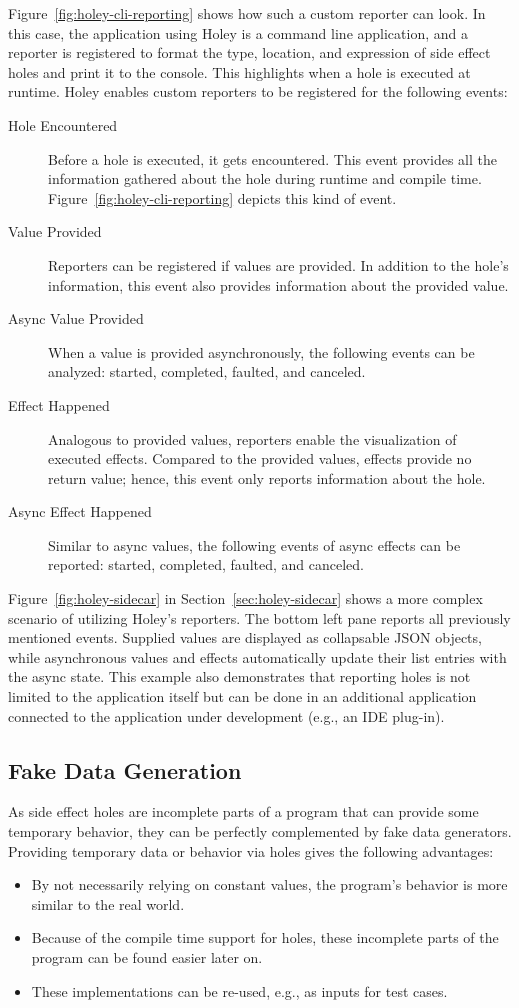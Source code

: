 Figure~\ref{fig:holey-cli-reporting} shows how such a custom reporter can look.
In this case, the application using Holey is a command line application, and a reporter is registered to format the type, location, and expression of side effect holes and print it to the console.
This highlights when a hole is executed at runtime.
Holey enables custom reporters to be registered for the following events:
\begin{description}
    \item[Hole Encountered] Before a hole is executed, it gets encountered. This event provides all the information gathered about the hole during runtime and compile time. Figure~\ref{fig:holey-cli-reporting} depicts this kind of event.
    \item[Value Provided] Reporters can be registered if values are provided. In addition to the hole's information, this event also provides information about the provided value.
    \item[Async Value Provided] When a value is provided asynchronously, the following events can be analyzed: started, completed, faulted, and canceled.
    \item[Effect Happened] Analogous to provided values, reporters enable the visualization of executed effects. Compared to the provided values, effects provide no return value; hence, this event only reports information about the hole.
    \item[Async Effect Happened] Similar to async values, the following events of async effects can be reported: started, completed, faulted, and canceled.
\end{description}
Figure~\ref{fig:holey-sidecar} in Section~\ref{sec:holey-sidecar} shows a more complex scenario of utilizing Holey's reporters.
The bottom left pane reports all previously mentioned events.
Supplied values are displayed as collapsable JSON objects, while asynchronous values and effects automatically update their list entries with the async state.
This example also demonstrates that reporting holes is not limited to the application itself but can be done in an additional application connected to the application under development (e.g., an IDE plug-in).

\subsection{Fake Data Generation}
\label{sec:holey-fake-data-generation}
As side effect holes are incomplete parts of a program that can provide some temporary behavior, they can be perfectly complemented by fake data generators.
Providing temporary data or behavior via holes gives the following advantages:
\begin{itemize}
    \item By not necessarily relying on constant values, the program's behavior is more similar to the real world.
    \item Because of the compile time support for holes, these incomplete parts of the program can be found easier later on.
    \item These implementations can be re-used, e.g., as inputs for test cases.
\end{itemize}

